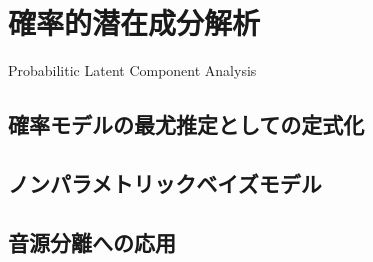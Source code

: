 \section{確率的潜在成分解析}

Probabilitic Latent Component Analysis

\subsection{確率モデルの最尤推定としての定式化}

\subsection{ノンパラメトリックベイズモデル}

\subsection{音源分離への応用}
